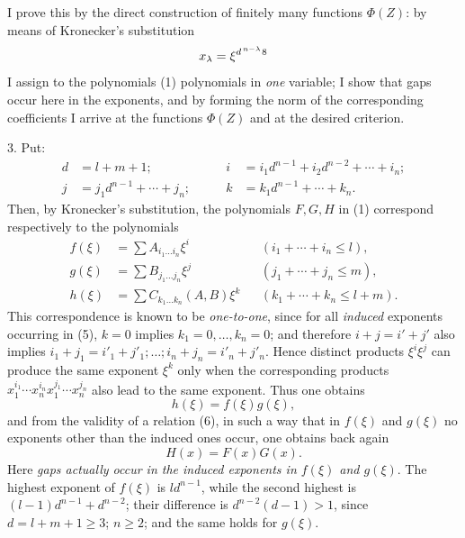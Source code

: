 \documentclass[11pt]{article}
\begin{document}
I prove this by the direct construction of finitely many functions $\Phi(Z)$: by means of Kronecker's substitution
\[
 x_\lambda=\xi^{d^{\,n-\lambda}}\text{\footnotemark[8]}
\]
\setcounter{footnote}{8}
I assign to the polynomials (1) polynomials in \emph{one} variable; I show that gaps occur here in the exponents, and by forming the norm of the corresponding coefficients I arrive at the functions $\Phi(Z)$ and at the desired criterion.

3. Put:
\begin{equation}
\begin{aligned}
 d&=l+m+1; &\qquad i&=i_1d^{n-1}+i_2d^{n-2}+\cdots+i_n;\\
 j&=j_1d^{n-1}+\cdots+j_n; &\qquad k&=k_1d^{n-1}+\cdots+k_n.
\end{aligned}
\tag{4}
\end{equation}
Then, by Kronecker's substitution, the polynomials $F,G,H$ in (1) correspond respectively to the polynomials
\begin{equation}
\begin{aligned}
 f(\xi)&=\sum A_{i_1\ldots i_n}\xi^i &&(i_1+\cdots+i_n\le l),\\
 g(\xi)&=\sum B_{j_1\ldots j_n}\xi^j &&(j_1+\cdots+j_n\le m),\\
 h(\xi)&=\sum C_{k_1\ldots k_n}(A,B)\xi^k &&(k_1+\cdots+k_n\le l+m).
\end{aligned}
\tag{5}
\end{equation}
This correspondence is known to be \emph{one-to-one}, since for all \emph{induced} exponents occurring in (5), $k=0$ implies $k_1=0,\ldots,k_n=0$; and therefore $i+j=i'+j'$ also implies $i_1+j_1=i'_1+j'_1;\ldots;i_n+j_n=i'_n+j'_n$. Hence distinct products $\xi^i\xi^j$ can produce the same exponent $\xi^k$ only when the corresponding products $x_1^{i_1}\cdots x_n^{i_n}x_1^{j_1}\cdots x_n^{j_n}$ also lead to the same exponent. Thus one obtains
\begin{equation}
 h(\xi)=f(\xi)g(\xi),
\tag{6}
\end{equation}
and from the validity of a relation (6), in such a way that in $f(\xi)$ and $g(\xi)$ no exponents other than the induced ones occur, one obtains back again
\begin{equation}
 H(x)=F(x)G(x).
\tag{7}
\end{equation}
Here \emph{gaps actually occur in the induced exponents in $f(\xi)$ and $g(\xi)$}. The highest exponent of $f(\xi)$ is $ld^{n-1}$, while the second highest is $(l-1)d^{n-1}+d^{n-2}$; their difference is $d^{n-2}(d-1)>1$, since $d=l+m+1\ge3$; $n\ge2$; and the same holds for $g(\xi)$.
\end{document}
